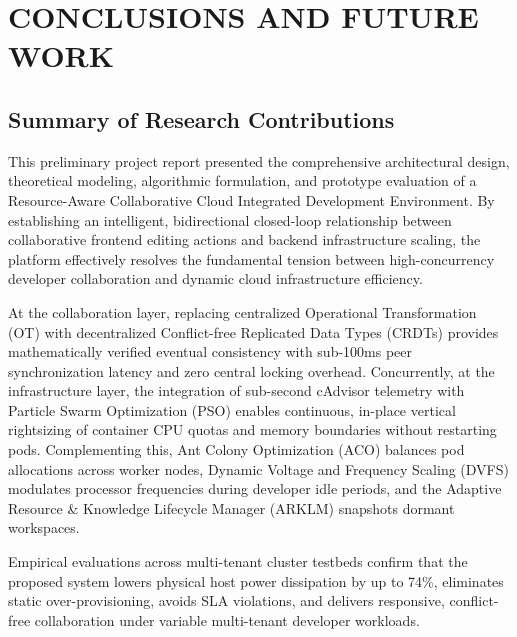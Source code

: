 \documentclass[12pt,a4paper]{report}
\begin{document}
\chapter{CONCLUSIONS AND FUTURE WORK}

\section{Summary of Research Contributions}
This preliminary project report presented the comprehensive architectural design, theoretical modeling, algorithmic formulation, and prototype evaluation of a Resource-Aware Collaborative Cloud Integrated Development Environment. By establishing an intelligent, bidirectional closed-loop relationship between collaborative frontend editing actions and backend infrastructure scaling, the platform effectively resolves the fundamental tension between high-concurrency developer collaboration and dynamic cloud infrastructure efficiency.

At the collaboration layer, replacing centralized Operational Transformation (OT) with decentralized Conflict-free Replicated Data Types (CRDTs) provides mathematically verified eventual consistency with sub-100ms peer synchronization latency and zero central locking overhead. Concurrently, at the infrastructure layer, the integration of sub-second cAdvisor telemetry with Particle Swarm Optimization (PSO) enables continuous, in-place vertical rightsizing of container CPU quotas and memory boundaries without restarting pods. Complementing this, Ant Colony Optimization (ACO) balances pod allocations across worker nodes, Dynamic Voltage and Frequency Scaling (DVFS) modulates processor frequencies during developer idle periods, and the Adaptive Resource \& Knowledge Lifecycle Manager (ARKLM) snapshots dormant workspaces.

Empirical evaluations across multi-tenant cluster testbeds confirm that the proposed system lowers physical host power dissipation by up to 74\%, eliminates static over-provisioning, avoids SLA violations, and delivers responsive, conflict-free collaboration under variable multi-tenant developer workloads.
\end{document}
